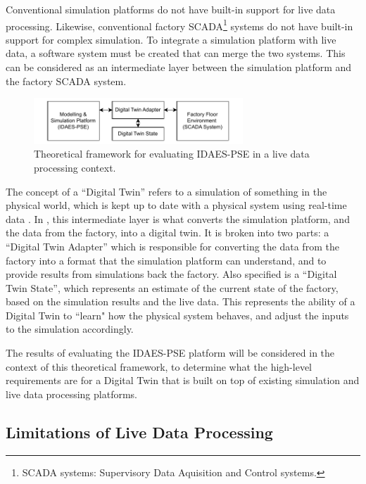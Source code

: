 \documentclass[12pt]{article}
\begin{document}
Conventional simulation platforms do not have built-in support for live data processing. Likewise, conventional factory SCADA\footnote{SCADA systems: Supervisory Data Aquisition and Control systems.} systems do not have built-in support for complex simulation. To integrate a simulation platform with live data, a software system must be created that can merge the two systems. This can be considered as an intermediate layer between the simulation platform and the factory SCADA system.


\begin{figure}[h]
    \centering
    \includegraphics[width=0.7\textwidth]{research_journal_framework_simple.pdf}
    \caption{Theoretical framework for evaluating IDAES-PSE in a live data processing context.}
    \label{fig:theoretical_framework}
\end{figure}

The concept of a “Digital Twin” refers to a simulation of something in the physical world, which is kept up to date with a physical system using real-time data \cite{yu2022energy}.
In , this intermediate layer is what converts the simulation platform, and the data from the factory, into a digital twin. It is broken into two parts: a ``Digital Twin Adapter'' which is responsible for converting the data from the factory into a format that the simulation platform can understand, and to provide results from simulations back the factory. Also specified is a ``Digital Twin State'', which represents an estimate of the current state of the factory, based on the simulation results and the live data. This represents the ability of a Digital Twin to ``learn" how the physical system behaves, and adjust the inputs to the simulation accordingly.

The results of evaluating the IDAES-PSE platform will be considered in the context of this theoretical framework, to determine what the high-level requirements are for a Digital Twin that is built on top of existing simulation and live data processing platforms.

\subsection{Limitations of Live Data Processing} \label{sec:limitations_framework}
\end{document}
